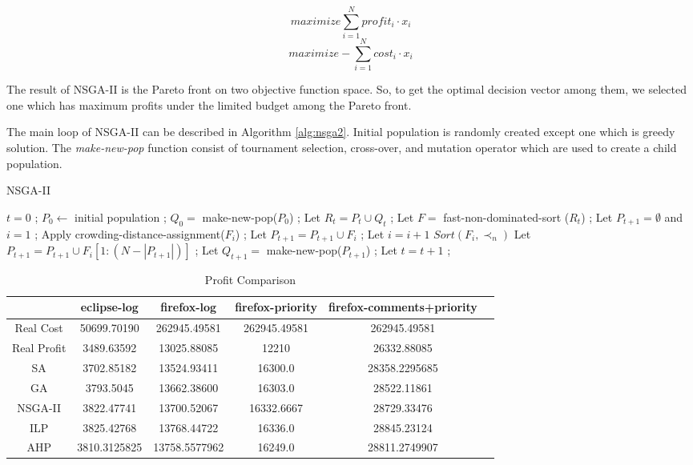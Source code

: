 \[
maximize \sum_{i = 1}^{N} profit_i \cdot x_i
\]
\[
maximize -\sum_{i = 1}^{N} cost_i \cdot x_i
\]

The result of NSGA-II is the Pareto front on two objective function space. So, to get the optimal decision vector among them, we selected one which has maximum profits under the limited budget among the Pareto front.

The main loop of NSGA-II can be described in Algorithm \ref{alg:nsga2}. Initial population is randomly created except one which is greedy solution. The \textit{make-new-pop} function consist of tournament selection, cross-over, and mutation operator which are used to create a child population.

\begin{algorithm}
\caption{NSGA-II}\label{alg:nsga2}
\begin{algorithmic}
    \State $t = 0$ ;
    \State $P_0 \gets$ initial population ;
    \State $Q_0 =$ make-new-pop($P_0$) ;
        \State Let $R_t = P_t \cup Q_t$ ;
        \State Let $F = $ fast-non-dominated-sort ($R_t$) ; %
        \State Let $P_{t+1} = \emptyset$ and $i = 1$ ;
            \State Apply crowding-distance-assignment($F_i$) ; %
            \State Let $P_{t+1} = P_{t+1} \cup F_i$ ;
            \State Let $i = i + 1$
        \EndWhile
        \State $Sort(F_i, \prec_n)$
        \State Let $P_{t+1} = P_{t+1} \cup F_i[1:(N - |P_{t+1}|)]$ ;
        \State Let $Q_{t+1} = $ make-new-pop($P_{t+1}$) ;
        \State Let $t = t + 1$ ;
    \EndWhile
\end{algorithmic}
\end{algorithm}

\begin{table*}
  \caption{Profit Comparison}
  \label{tab:commands}
  \begin{tabular}{cccccl}
    \toprule
    &eclipse-log&firefox-log&firefox-priority&firefox-comments+priority\\
    \midrule
    Real Cost&50699.70190&262945.49581&262945.49581&262945.49581 \\
    Real Profit&3489.63592&13025.88085&12210&26332.88085 \\
    \hline
    SA&3702.85182&13524.93411&16300.0&28358.2295685 \\
    GA&3793.5045&13662.38600&16303.0&28522.11861 \\
    NSGA-II&3822.47741&13700.52067&16332.6667&28729.33476 \\
    ILP&3825.42768&13768.44722&16336.0&28845.23124 \\
    AHP&3810.3125825&13758.5577962&16249.0&28811.2749907 \\
    \bottomrule
  \end{tabular}
\end{table*}

